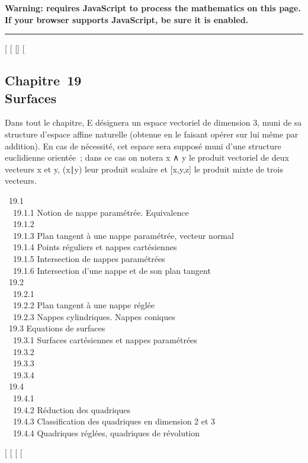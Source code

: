 \textbf{Warning: 
requires JavaScript to process the mathematics on this page.\\ If your
browser supports JavaScript, be sure it is enabled.}

\begin{center}\rule{3in}{0.4pt}\end{center}

{[}
{[}
{[}{]}
{[}

\subsection{Chapitre~19\\Surfaces}

Dans tout le chapitre, E désignera un espace vectoriel de dimension 3,
muni de sa structure d'espace affine naturelle (obtenue en le faisant
opérer sur lui même par addition). En cas de nécessité, cet espace sera
supposé muni d'une structure euclidienne orientée~; dans ce cas on
notera x ∧ y le produit vectoriel de deux vecteurs x et y,
(x∣y) leur produit scalaire et {[}x,y,z{]} le
produit mixte de trois vecteurs.

~19.1  \\
~~19.1.1 {Notion de nappe
paramétrée. Equivalence} \\ ~~19.1.2
 \\ ~~19.1.3
{Plan tangent à une nappe
paramétrée, vecteur normal} \\ ~~19.1.4
{Points réguliers et nappes
cartésiennes} \\ ~~19.1.5
{Intersection de nappes
paramétrées} \\ ~~19.1.6
{Intersection d'une nappe et de
son plan tangent} \\ ~19.2
 \\ ~~19.2.1
 \\
~~19.2.2 {Plan tangent à une
nappe réglée} \\ ~~19.2.3
{Nappes cylindriques. Nappes
coniques} \\ ~19.3 {Equations de
surfaces} \\ ~~19.3.1 {Surfaces
cartésiennes et nappes paramétrées} \\ ~~19.3.2
 \\ ~~19.3.3
 \\ ~~19.3.4
 \\
~19.4  \\ ~~19.4.1
 \\
~~19.4.2 {Réduction des
quadriques} \\ ~~19.4.3
{Classification des quadriques
en dimension 2 et 3} \\ ~~19.4.4
{Quadriques réglées, quadriques
de révolution}

{[}
{[}
{[}
{[}
